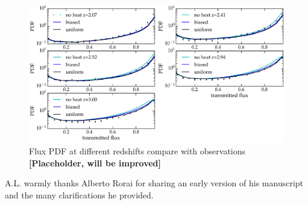 \documentclass[numberedappendix]{emulateapj}
\newcommand\ALc[1]{{\color{red} \bf #1}} %
\begin{document}
\begin{figure}[h]
\centering
\includegraphics[width = .9\textwidth ]{flux_PDF}
\caption{Flux PDF at different redshifts compare with observations \ALc{[Placeholder, will be improved]}}
\label{fig:fluxPDF}
\end{figure}

\begin{acknowledgements}
A.L. warmly thanks Alberto Rorai for sharing an early version of his manuscript and the many clarifications he provided.
\end{acknowledgements}




\end{document}
